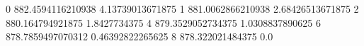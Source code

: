 0 882.4594116210938 4.13739013671875
1 881.0062866210938 2.68426513671875
2 880.164794921875 1.8427734375
4 879.3529052734375 1.0308837890625
6 878.7859497070312 0.46392822265625
8 878.322021484375 0.0
